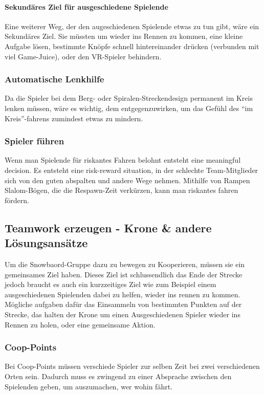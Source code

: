 \paragraph{Sekundäres Ziel für ausgeschiedene Spielende}
Eine weiterer Weg, der den augeschiedenen Spielende etwas zu tun gibt, wäre ein Sekundäres Ziel. Sie müssten um wieder ins Rennen zu kommen, eine kleine Aufgabe lösen, bestimmte Knöpfe schnell hintereinander drücken (verbunden mit viel Game-Juice), oder den VR-Spieler behindern.

\subsubsection{Automatische Lenkhilfe}
Da die Spieler bei dem Berg- oder Spiralen-Streckendesign permanent im Kreis lenken müssen, wäre es wichtig, dem entgegenzuwirken, um das Gefühl des "`im Kreis"'-fahrens zumindest etwas zu mindern.

\subsubsection{Spieler führen}
Wenn man Spielende für riskantes Fahren belohnt entsteht eine meaningful decision. Es entsteht eine risk-reward situation, in der schlechte Team-Mitglieder sich von den guten abspalten und andere Wege nehmen. Mithilfe von Rampen Slalom-Bögen, die die Respawn-Zeit verkürzen, kann man riskantes fahren fördern.

\subsection{Teamwork erzeugen - Krone \& andere Lösungsansätze\label{_teamwork_erzeugen}}
Um die Snowbaord-Gruppe dazu zu bewegen zu Kooperieren, müssen sie ein gemeinsames Ziel haben. Dieses Ziel ist schlussendlich das Ende der Strecke jedoch braucht es auch ein kurzzeitiges Ziel wie zum Beispiel einem ausgeschiedenen Spielenden dabei zu helfen, wieder ins rennen zu kommen. Mögliche aufgaben dafür das Einsammeln von bestimmten Punkten auf der Strecke, das halten der Krone um einen Ausgeschiedenen Spieler wieder ins Rennen zu holen, oder eine gemeinsame Aktion.

\subsubsection{Coop-Points}
Bei Coop-Points müssen verschiede Spieler zur selben Zeit bei zwei verschiedenen Orten sein. Dadurch muss es zwingend zu einer Absprache zwischen den Spielenden geben, um auszumachen, wer wohin fährt.

